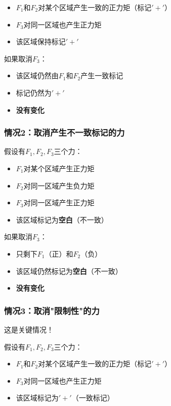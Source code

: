 \documentclass[12pt,a4paper]{article}
\begin{document}
\begin{itemize}
    \item $F_1$和$F_2$对某个区域产生一致的正力矩（标记$'+'$）
    \item $F_3$对同一区域也产生正力矩
    \item 该区域保持标记$'+'$
\end{itemize}

如果取消$F_3$：
\begin{itemize}
    \item 该区域仍然由$F_1$和$F_2$产生一致标记
    \item 标记仍然为$'+'$
    \item \textbf{没有变化}
\end{itemize}

\subsubsection{情况2：取消产生不一致标记的力}

假设有$F_1, F_2, F_3$三个力：

\begin{itemize}
    \item $F_1$对某个区域产生正力矩
    \item $F_2$对同一区域产生负力矩
    \item $F_3$对同一区域产生正力矩
    \item 该区域标记为\textbf{空白}（不一致）
\end{itemize}

如果取消$F_3$：
\begin{itemize}
    \item 只剩下$F_1$（正）和$F_2$（负）
    \item 该区域仍然标记为\textbf{空白}（不一致）
    \item \textbf{没有变化}
\end{itemize}

\subsubsection{情况3：取消"限制性"的力}

这是关键情况！

假设有$F_1, F_2, F_3$三个力：

\begin{itemize}
    \item $F_1$和$F_2$对某个区域产生一致的正力矩（标记$'+'$）
    \item $F_3$对同一区域也产生正力矩
    \item 该区域标记为$'+'$（一致标记）
\end{itemize}
\end{document}
